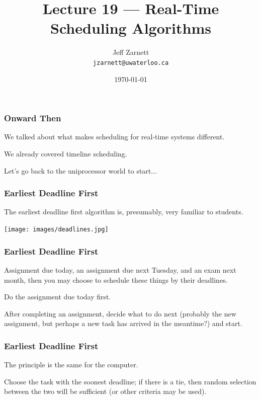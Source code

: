 

\title{Lecture 19 --- Real-Time Scheduling Algorithms }

\author{Jeff Zarnett \\ \small \texttt{jzarnett@uwaterloo.ca}}
\date{\today}




\begin{frame}
  \titlepage

 \end{frame}


\begin{frame}
\frametitle{Onward Then}

We talked about what makes scheduling for real-time systems different.

We already covered timeline scheduling.

Let's go back to the uniprocessor world to start...

\end{frame}


\begin{frame}
\frametitle{Earliest Deadline First}

The earliest deadline first algorithm is, presumably, very familiar to students. 

\begin{center}
	\texttt{[image: images/deadlines.jpg]}
\end{center}

\end{frame}


\begin{frame}
\frametitle{Earliest Deadline First}

Assignment due today, an assignment due next Tuesday, and an exam next month, then you may choose to schedule these things by their deadlines. 

Do the assignment due today first. 

After completing an assignment, decide what to do next (probably the new assignment, but perhaps a new task has arrived in the meantime?) and start.


\end{frame}

\begin{frame}
\frametitle{Earliest Deadline First}

The principle is the same for the computer. 

Choose the task with the soonest deadline; if there is a tie, then random selection between the two will be sufficient (or other criteria may be used). 

\end{frame}

